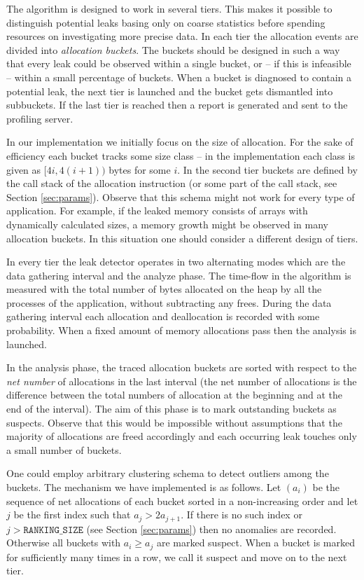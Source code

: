 \documentclass[preprint, numbers]{sigplanconf}
\begin{document}
The algorithm is designed to work in several tiers.
This makes it possible to distinguish potential leaks basing only on coarse statistics before spending resources on investigating more
precise data.
In each tier the allocation events are divided into \textit{allocation buckets}.
The buckets should be designed in such a way that every leak could be observed within a single bucket,
or -- if this is infeasible -- within a small percentage of buckets.
When a bucket is diagnosed to contain a potential leak, the next tier is launched and the bucket gets dismantled
into subbuckets.
If the last tier is reached then a report is generated and sent to the profiling server.

In our implementation we initially focus on the size of allocation.
For the sake of efficiency each bucket tracks some size class --
in the implementation each class is given as $[4i, 4(i+1))$ bytes for some $i$.
In the second tier buckets are defined by the call stack of the allocation instruction
(or some part of the call stack, see Section \ref{sec:params}).
Observe that this schema might not work for every type of application.
For example, if the leaked memory consists of arrays with dynamically calculated sizes,
a memory growth might be observed in many allocation buckets.
In this situation one should consider a different design of tiers.

In every tier the leak detector operates in two alternating modes which are
the data gathering interval and the analyze phase.
The time-flow in the algorithm is measured with the total number of bytes allocated on the heap
by all the processes of the application, without subtracting any frees.
During the data gathering interval each allocation and deallocation is recorded with some
probability.
When a fixed amount of memory allocations pass then the analysis is launched.

In the analysis phase, the traced allocation buckets are sorted with respect to the \textit{net number} of allocations
in the last interval
(the net number of allocations is the difference between the total numbers of allocation at
the beginning and at the end of the interval).
The aim of this phase is to mark outstanding buckets as suspects.
Observe that this would be impossible without assumptions that
the majority of allocations are freed accordingly and each occurring leak
touches only a small number of buckets.

One could employ arbitrary clustering schema to detect outliers among the buckets.
The mechanism we have implemented is as follows.
Let $(a_i)$ be the sequence of net allocations of each bucket sorted in a non-increasing order
and let $j$ be the first index such that $a_j > 2a_{j+1}$.
If there is no such index or $j > \texttt{RANKING\_SIZE}$ (see Section \ref{sec:params}) then no anomalies are recorded.
Otherwise all buckets with $a_i \ge a_j$ are marked suspect.
When a bucket is marked for sufficiently many times in a row,
we call it suspect and move on to the next tier.
\end{document}
